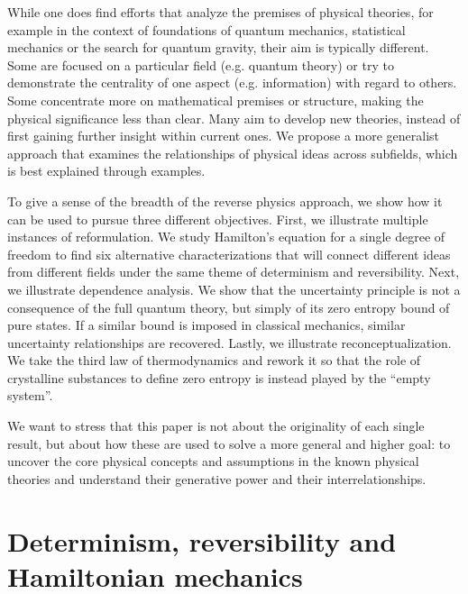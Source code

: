 \documentclass[10pt,twocolumn, nofootinbib]{revtex4-2}
\begin{document}
While one does find efforts that analyze the premises of physical theories, for example in the context of foundations of quantum mechanics, statistical mechanics or the search for quantum gravity, their aim is typically different. Some are focused on a particular field (e.g. quantum theory) or try to demonstrate the centrality of one aspect (e.g. information) with regard to others. Some concentrate more on mathematical premises or structure, making the physical significance less than clear. Many aim to develop new theories, instead of first gaining further insight within current ones. We propose a more generalist approach that examines the relationships of physical ideas across subfields, which is best explained through examples. 


To give a sense of the breadth of the reverse physics approach, we show how it can be used to pursue three different objectives. First, we illustrate multiple instances of reformulation. We study Hamilton's equation for a single degree of freedom to find six alternative characterizations that will connect different ideas from different fields under the same theme of determinism and reversibility. Next, we illustrate dependence analysis. We show that the uncertainty principle is not a consequence of the full quantum theory, but simply of its zero entropy bound of pure states. If a similar bound is imposed in classical mechanics, similar uncertainty relationships are recovered. Lastly, we illustrate reconceptualization. We take the third law of thermodynamics and rework it so that the role of crystalline substances to define zero entropy is instead played by the ``empty system''.

We want to stress that this paper is not about the originality of each single result, but about how these are used to solve a more general and higher goal: to uncover the core physical concepts and assumptions in the known physical theories and understand their generative power and their interrelationships. 





\section{Determinism, reversibility and Hamiltonian mechanics}
\end{document}
